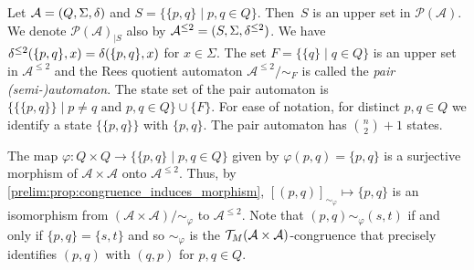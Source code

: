 
\label{def:pair_aut}
Let $\mathcal A = (Q, \Sigma, \delta)$ and $S = \{ \{ p, q\} \mid p,q \in Q\}$.
Then~$S$ is an upper set in $\mathcal P(\mathcal A)$.
We denote $\mathcal P(\mathcal A)_{|S}$
also by $\mathcal A^{\le 2} = (S, \Sigma, \delta^{\le 2})$.
We have $\delta^{\le 2}(\{p,q\},x) = \delta(\{p,q\},x)$
for $x \in \Sigma$.
The set $F = \{ \{q\} \mid q \in Q \}$ is an upper set in $\mathcal A^{\le 2}$
and the Rees quotient automaton $\mathcal A^{\le 2} / {\sim_F}$ is called the \emph{pair (semi-)automaton}. 
The state set of the pair automaton is
$\{ \{ \{ p,q\}\} \mid p \ne q \text{ and } p,q \in Q\} \cup \{F\}$.
For ease of notation, for distinct $p,q \in Q$ we identify a state $\{ \{p,q\} \}$ with $\{p,q\}$.
The pair automaton has $\binom{n}{2} + 1$ states.

The map $\varphi \colon Q \times Q \to \{\{p,q\} \mid p,q \in Q \}$
given by $\varphi(p,q) = \{p,q\}$ is a surjective morphism
of $\mathcal A \times \mathcal A$ onto $\mathcal A^{\le 2}$.
Thus, by \cref{prelim:prop:congruence_induces_morphism},
$[(p,q)]_{\sim_{\varphi}} \mapsto \{p,q\}$
is an isomorphism from 
$( \mathcal A \times \mathcal A ) / {\sim_{\varphi}}$ to $\mathcal A^{\le 2}$.
Note that $(p,q) \sim_{\varphi} (s,t)$ if and only if $\{p,q\} = \{s,t\}$
and so $\sim_{\varphi}$ is the $\mathcal T_M(\mathcal A \times \mathcal A)$-congruence
that precisely identifies $(p,q)$ with $(q,p)$ for $p,q \in Q$.